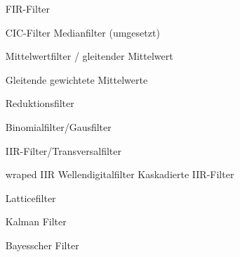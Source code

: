 \documentclass[a4paper,11pt]{article}
\begin{document}
\begin{itemize}
\item[FIR-Filter]

	\subitem CIC-Filter
	\subitem Medianfilter (umgesetzt)

	\subitem Mittelwertfilter / gleitender Mittelwert

	\subitem Gleitende gewichtete Mittelwerte

	\subitem Reduktionsfilter

	\subitem Binomialfilter/Gausfilter

\item[IIR-Filter/Transversalfilter]

	\subitem wraped IIR
	\subitem Wellendigitalfilter
	\subitem Kaskadierte IIR-Filter

\item[Latticefilter]


\item[Kalman Filter]

\item[Bayesscher Filter]

\end{itemize}
		
\end{document}
